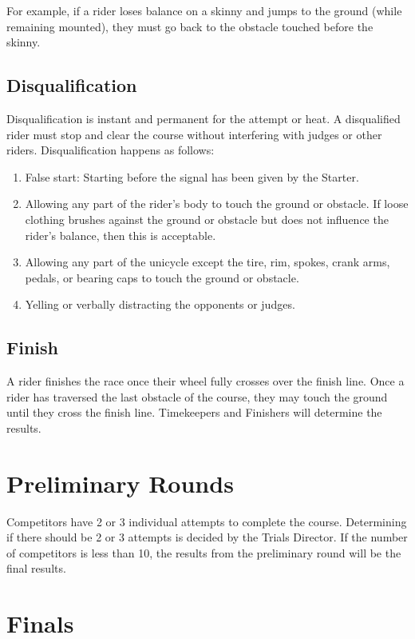 For example, if a rider loses balance on a skinny and jumps to the ground (while remaining mounted), they must go back to the obstacle touched before the skinny.

\subsection{Disqualification}

Disqualification is instant and permanent for the attempt or heat.
A disqualified rider must stop and clear the course without interfering with judges or other riders.
Disqualification happens as follows:
\begin{enumerate}
\item False start: Starting before the signal has been given by the Starter.
\item Allowing any part of the rider's body to touch the ground or obstacle.
If loose clothing brushes against the ground or obstacle but does not influence the rider's balance, then this is acceptable.
\item Allowing any part of the unicycle except the tire, rim, spokes, crank arms, pedals, or bearing caps to touch the ground or obstacle.
\item Yelling or verbally distracting the opponents or judges.
\end{enumerate}

\subsection{Finish}

A rider finishes the race once their wheel fully crosses over the finish line.
Once a rider has traversed the last obstacle of the course, they may touch the ground until they cross the finish line.
Timekeepers and Finishers will determine the results.

\section{Preliminary Rounds}

Competitors have 2 or 3 individual attempts to complete the course.
Determining if there should be 2 or 3 attempts is decided by the Trials Director.
If the number of competitors is less than 10, the results from the preliminary round will be the final results.

\section{Finals}

